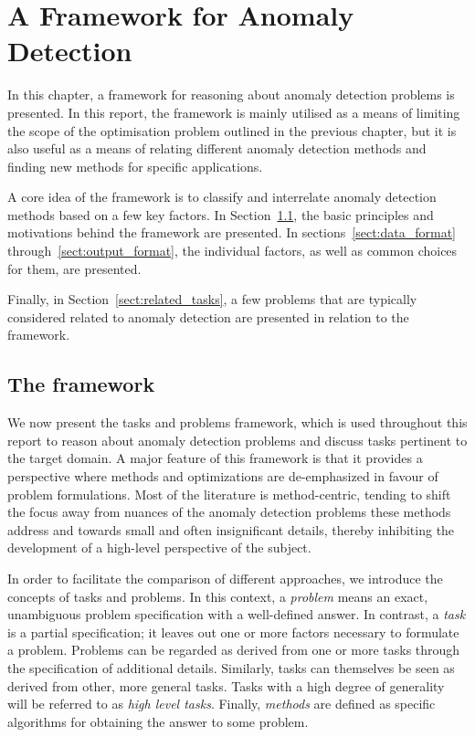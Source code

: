 \chapter{A Framework for Anomaly Detection}
\label{ch:framework}

In this chapter, a framework for reasoning about anomaly detection problems is presented. In this report, the framework is mainly utilised as a means of limiting the scope of the optimisation problem outlined in the previous chapter, but it is also useful as a means of relating different anomaly detection methods and finding new methods for specific applications.

A core idea of the framework is to classify and interrelate anomaly detection methods based on a few key factors. In Section~\ref{sect:the_framework}, the basic principles and motivations behind the framework are presented. In sections~\ref{sect:data_format} through~\ref{sect:output_format}, the individual factors, as well as common choices for them, are presented.

Finally, in Section~\ref{sect:related_tasks}, a few problems that are typically considered related to anomaly detection are presented in relation to the framework.

\section{The framework}
\label{sect:the_framework}

We now present the tasks and problems framework, which is used throughout this report to reason about anomaly detection problems and discuss tasks pertinent to the target domain. A major feature of this framework is that it provides a perspective where methods and optimizations are de-emphasized in favour of problem formulations. Most of the literature is method-centric, tending to shift the focus away from nuances of the anomaly detection problems these methods address and towards small and often insignificant details, thereby inhibiting the development of a high-level perspective of the subject.

In order to facilitate the comparison of different approaches, we introduce the concepts of tasks and problems. In this context, a \emph{problem} means an exact, unambiguous problem specification with a well-defined answer. In contrast, a \emph{task} is a partial specification; it leaves out one or more factors necessary to formulate a problem. Problems can be regarded as derived from one or more tasks through the specification of additional details. Similarly, tasks can themselves be seen as derived from other, more general tasks. Tasks with a high degree of generality will be referred to as \emph{high level tasks}. Finally, \emph{methods} are defined as specific algorithms for obtaining the answer to some problem.

